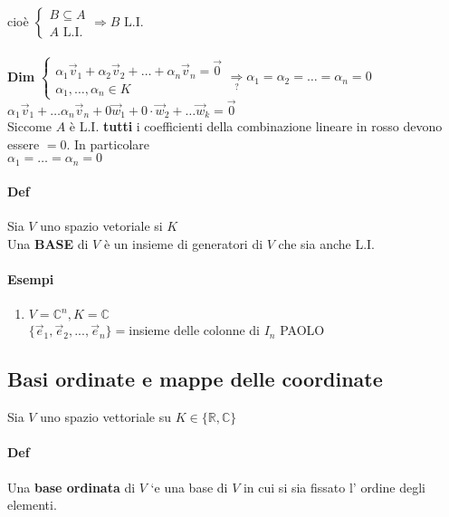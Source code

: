 \begin{enumerate}
        cioè 
        $
            \begin{cases}
                B\subseteq A\\
                A \textrm{ L.I.}
            \end{cases}
            \Longrightarrow
            B\textrm{ L.I.}
        $\\\\
        \color{red}
        \textbf{Dim}
        $
        \begin{cases}
            \alpha_1\vec{v}_1+\alpha_2\vec{v}_2+\dots+\alpha_n\vec{v}_n=\vec{0}\\
            \alpha_1,\dots,\alpha_n\in K
        \end{cases}
        \underset{?}{\Longrightarrow} \alpha_1=\alpha_2=\dots =\alpha_n=0
        $\\
        \color{black}
        $\alpha_1\vec{v}_1+\dots\alpha_n\vec{v}_n+0\vec{w}_1+0\cdot\vec{w}_2+
        \dots\vec{w}_k=\vec{0}$\\
        Siccome $A$ è L.I. \textbf{tutti} i coefficienti della combinazione lineare
        in rosso devono essere $=0$. In particolare \\
        $\alpha_1=\dots=\alpha_n=0$
\end{enumerate}

\paragraph{Def} Sia $V$ uno spazio vetoriale si $K$\\
Una \textbf{BASE} di $V$ è un insieme di generatori di $V$ che sia anche L.I. 
\paragraph{Esempi}
\begin{enumerate}
    \item $V=\mathbb{C}^n, K=\mathbb{C}$\\
        $\{\vec{e}_1,\vec{e}_2, ... , \vec{e}_n\}=$insieme delle colonne di $I_n$ 
        PAOLO
\end{enumerate}


\subsection{Basi ordinate e mappe delle coordinate}
Sia $V$ uno spazio vettoriale su $K\in\{\mathbb{R}, \mathbb{C}\}$
\paragraph{Def} Una \textbf{base ordinata} di $V$ `e una base di $V$ in cui si sia fissato l' ordine degli elementi. 
